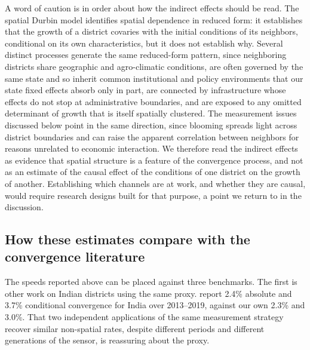 \documentclass[
  a4paper, 
  twoside,
  final
]{article}
\begin{document}
A word of caution is in order about how the indirect effects should be
read. The spatial Durbin model identifies spatial dependence in reduced
form: it establishes that the growth of a district covaries with the
initial conditions of its neighbors, conditional on its own
characteristics, but it does not establish why. Several distinct
processes generate the same reduced-form pattern, since neighboring
districts share geographic and agro-climatic conditions, are often
governed by the same state and so inherit common institutional and
policy environments that our state fixed effects absorb only in part,
are connected by infrastructure whose effects do not stop at
administrative boundaries, and are exposed to any omitted determinant of
growth that is itself spatially clustered. The measurement issues
discussed below point in the same direction, since blooming spreads
light across district boundaries and can raise the apparent correlation
between neighbors for reasons unrelated to economic interaction. We
therefore read the indirect effects as evidence that spatial structure
is a feature of the convergence process, and not as an estimate of the
causal effect of the conditions of one district on the growth of
another. Establishing which channels are at work, and whether they are
causal, would require research designs built for that purpose, a point
we return to in the discussion.

\subsection{How these estimates compare with the convergence
literature}\label{how-these-estimates-compare-with-the-convergence-literature}

The speeds reported above can be placed against three benchmarks. The
first is other work on Indian districts using the same proxy.
\citet{beyer_yamada_district_banks} report 2.4\% absolute and 3.7\%
conditional convergence for India over 2013--2019, against our own 2.3\%
and 3.0\%. That two independent applications of the same measurement
strategy recover similar non-spatial rates, despite different periods
and different generations of the sensor, is reassuring about the proxy.
\end{document}

